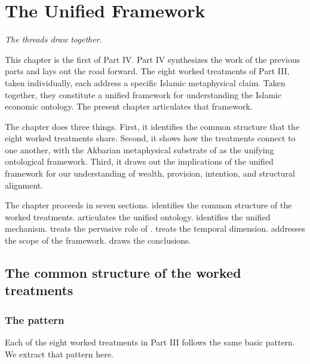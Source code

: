 \chapter{The Unified Framework}
\label{ch:unified}

\epigraph{\itshape The threads draw together.}{}

\noindent
This chapter is the first of Part IV. Part IV synthesizes the work
of the previous parts and lays out the road forward. The eight
worked treatments of Part III, taken individually, each address
a specific Islamic metaphysical claim. Taken together, they
constitute a unified framework for understanding the Islamic
economic ontology. The present chapter articulates that
framework.

The chapter does three things. First, it identifies the common
structure that the eight worked treatments share. Second, it shows
how the treatments connect to one another, with the Akbarian
metaphysical substrate of  as the unifying
ontological framework. Third, it draws out the implications of the
unified framework for our understanding of wealth, provision,
intention, and structural alignment.

The chapter proceeds in seven sections. 
identifies the common structure of the worked treatments.
 articulates the unified ontology.
 identifies the unified mechanism.
 treats the pervasive role of .
 treats the temporal dimension.
 addresses the scope of the framework.
 draws the conclusions.

\section{The common structure of the worked treatments}
\label{sec:unified-structure}

\subsection{The pattern}

Each of the eight worked treatments in Part III follows the same
basic pattern. We extract that pattern here.

